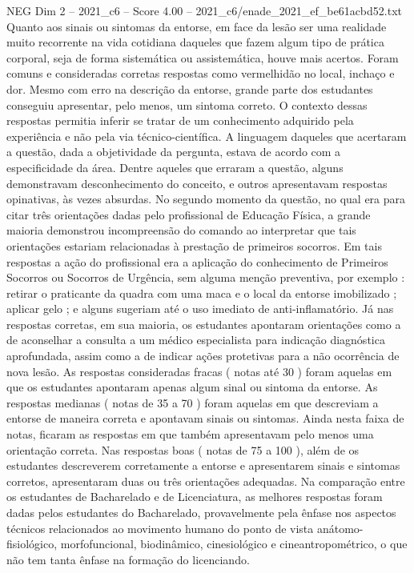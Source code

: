 \begin{textsample}{NEG Dim 2 – 2021\_c6 – Score 4.00 – 2021\_c6/enade\_2021\_ef\_be61acbd52.txt}
Quanto aos sinais ou sintomas da entorse, em face da lesão ser uma realidade muito recorrente na vida cotidiana daqueles que fazem algum tipo de prática corporal, seja de forma sistemática ou assistemática, houve mais acertos.
Foram comuns e consideradas corretas respostas como vermelhidão no local, inchaço e dor.
Mesmo com erro na descrição da entorse, grande parte dos estudantes conseguiu apresentar, pelo menos, um sintoma correto.
O contexto dessas respostas permitia inferir se tratar de um conhecimento adquirido pela experiência e não pela via técnico-científica.
A linguagem daqueles que acertaram a questão, dada a objetividade da pergunta, estava de acordo com a especificidade da área.
Dentre aqueles que erraram a questão, alguns demonstravam desconhecimento do conceito, e outros apresentavam respostas opinativas, às vezes absurdas.
No segundo momento da questão, no qual era para citar três orientações dadas pelo profissional de Educação Física, a grande maioria demonstrou incompreensão do comando ao interpretar que tais orientações estariam relacionadas à prestação de primeiros socorros.
Em tais respostas a ação do profissional era a aplicação do conhecimento de Primeiros Socorros ou Socorros de Urgência, sem alguma menção preventiva, por exemplo : retirar o praticante da quadra com uma maca e o local da entorse imobilizado ; aplicar gelo ; e alguns sugeriam até o uso imediato de anti-inflamatório.
Já nas respostas corretas, em sua maioria, os estudantes apontaram orientações como a de aconselhar a consulta a um médico especialista para indicação diagnóstica aprofundada, assim como a de indicar ações protetivas para a não ocorrência de nova lesão.
As respostas consideradas fracas ( notas até 30 ) foram aquelas em que os estudantes apontaram apenas algum sinal ou sintoma da entorse.
As respostas medianas ( notas de 35 a 70 ) foram aquelas em que descreviam a entorse de maneira correta e apontavam sinais ou sintomas.
Ainda nesta faixa de notas, ficaram as respostas em que também apresentavam pelo menos uma orientação correta.
Nas respostas boas ( notas de 75 a 100 ), além de os estudantes descreverem corretamente a entorse e apresentarem sinais e sintomas corretos, apresentaram duas ou três orientações adequadas.
Na comparação entre os estudantes de Bacharelado e de Licenciatura, as melhores respostas foram dadas pelos estudantes do Bacharelado, provavelmente pela ênfase nos aspectos técnicos relacionados ao movimento humano do ponto de vista anátomo-fisiológico, morfofuncional, biodinâmico, cinesiológico e cineantropométrico, o que não tem tanta ênfase na formação do licenciando.

\end{textsample}
